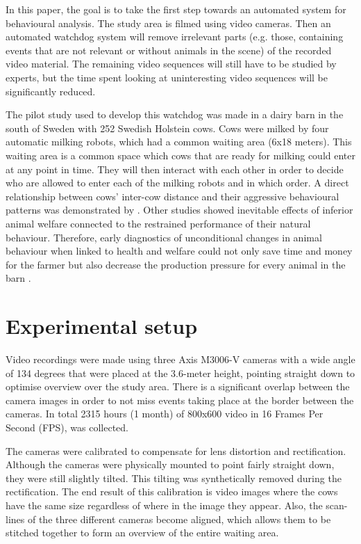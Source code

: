 \documentclass[10pt,a4paper,twocolumn]{article}
\begin{document}
In this paper, the goal is to take the first step towards an automated system for behavioural analysis. The study area is filmed using video cameras. Then an automated watchdog system will remove irrelevant parts (e.g. those, containing events that are not relevant or without animals in the scene) of the recorded video material. The remaining video sequences will still have to be studied by experts, but the time spent looking at uninteresting video sequences will be significantly reduced.

The pilot study used to develop this watchdog was made in a dairy barn in the south of Sweden with 252 Swedish Holstein cows. Cows were milked by four automatic milking robots, which had a common waiting area (6x18 meters). This waiting area is a common space which cows that are ready for milking could enter at any point in time. They will then interact with each other  in order to decide who are allowed to enter each of the milking robots and in which order. A direct relationship between cows' inter-cow distance and their aggressive behavioural patterns was demonstrated by \cite{DeVriesetal2004}. Other studies \cite{Hemsworth2003, Kilgour2012} showed inevitable effects of inferior animal welfare connected to the restrained performance of their natural behaviour. Therefore, early diagnostics of unconditional changes in animal behaviour when linked to health and welfare could not only save time and money for the farmer but also decrease the production pressure for every animal in the barn \cite{Polikarpusetal2015}.


\section{Experimental setup}

Video recordings were made using three Axis M3006-V cameras with a wide angle of 134 degrees that were placed at the 3.6-meter height, pointing straight down to optimise overview over the study area. There is a significant overlap between the camera images in order to not miss events taking place at the border between the cameras. In total 2315 hours (1 month) of 800x600 video in 16 Frames Per Second (FPS), was collected.

The cameras were calibrated to compensate for lens distortion and rectification. Although the cameras were physically mounted to point fairly straight down, they were still slightly tilted. This tilting was synthetically removed during the rectification. The end result of this calibration is video images where the cows have the same size regardless of where in the image they appear. Also, the scan-lines of the three different cameras become aligned, which allows them to be stitched together to form an overview of the entire waiting area.
\end{document}
